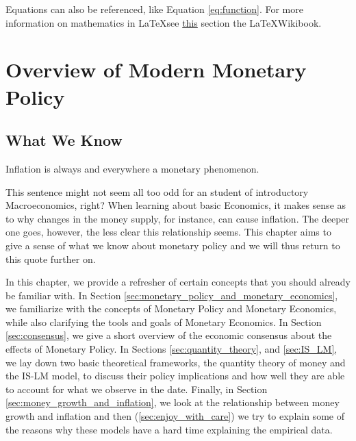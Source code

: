 \documentclass[11pt,a4paper,oneside]{book}
\newcommand{\latex}{\LaTeX{}} %
\begin{document}
Equations can also be referenced, like Equation \ref{eq:function}. For more information on mathematics in \latex see \href{https://en.wikibooks.org/wiki/LaTeX/Mathematics}{this} section the \latex Wikibook.

\part{Overview of Modern Monetary Policy}
\chapter{What We Know}
\epigraph{Inflation is always and everywhere a monetary phenomenon.}{\citet{Friedman_1963}}

This sentence might not seem all too odd for an student of introductory Macroeconomics, right? When learning about basic Economics, it makes sense as to why changes in the money supply, for instance, can cause inflation. The deeper one goes, however, the less clear this relationship seems. This chapter aims to give a sense of what we know about monetary policy and we will thus return to this quote further on.

In this chapter, we provide a refresher of certain concepts that you should already be familiar with. In Section \ref{sec:monetary_policy_and_monetary_economics}, we familiarize with the concepts of Monetary Policy and Monetary Economics, while also clarifying the tools and goals of Monetary Economics. In Section \ref{sec:consensus}, we give a short overview of the economic consensus about the effects of Monetary Policy. In Sections \ref{sec:quantity_theory}, and \ref{sec:IS_LM}, we lay down two basic theoretical frameworks, the quantity theory of money and the IS-LM model, to discuss their policy implications and how well they are able to account for what we observe in the date. Finally, in Section \ref{sec:money_growth_and_inflation}, we look at the relationship between money growth and inflation and then (\ref{sec:enjoy_with_care}) we try to explain some of the reasons why these models have a hard time explaining the empirical data.

\end{document}
